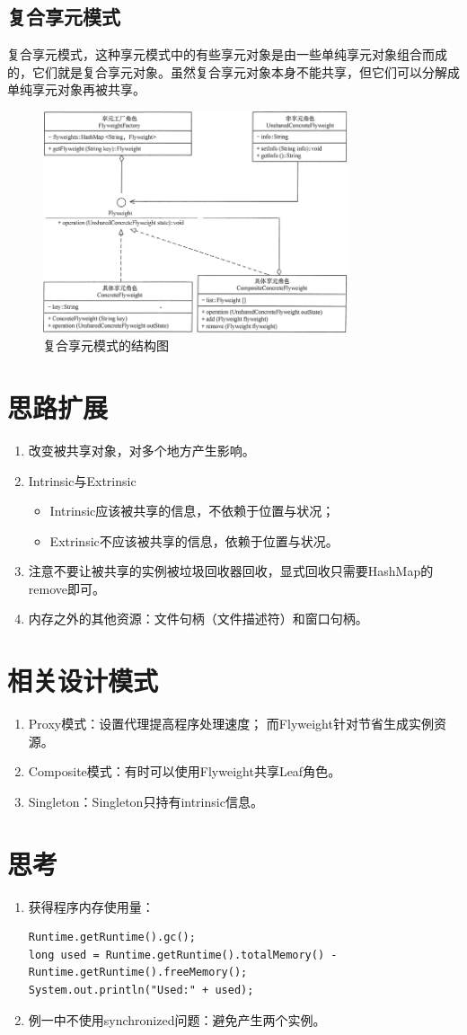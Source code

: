 \subsection{复合享元模式}
复合享元模式，这种享元模式中的有些享元对象是由一些单纯享元对象组合而成的，它们就是复合享元对象。虽然复合享元对象本身不能共享，但它们可以分解成单纯享元对象再被共享。
\begin{figure}[!h]
	\centering
	\includegraphics[width=0.8\textwidth]{image/20-4}
	\caption{复合享元模式的结构图}
\end{figure}
\section{思路扩展}
\begin{enumerate}
	\item 改变被共享对象，对多个地方产生影响。
	\item Intrinsic与Extrinsic
	\begin{itemize}
		\item Intrinsic应该被共享的信息，不依赖于位置与状况；
		\item Extrinsic不应该被共享的信息，依赖于位置与状况。
	\end{itemize}
	\item 注意不要让被共享的实例被垃圾回收器回收，显式回收只需要HashMap的remove即可。
	\item 内存之外的其他资源：文件句柄（文件描述符）和窗口句柄。
\end{enumerate}
\section{相关设计模式}
\begin{enumerate}
	\item Proxy模式：设置代理提高程序处理速度；
	而Flyweight针对节省生成实例资源。
	\item Composite模式：有时可以使用Flyweight共享Leaf角色。
	\item Singleton：Singleton只持有intrinsic信息。
\end{enumerate}
\section{思考}
\begin{enumerate}
	\item 获得程序内存使用量：
	\begin{lstlisting}
Runtime.getRuntime().gc();
long used = Runtime.getRuntime().totalMemory() - Runtime.getRuntime().freeMemory();
System.out.println("Used:" + used);
	\end{lstlisting}
	\item 例一中不使用synchronized问题：避免产生两个实例。
\end{enumerate}
